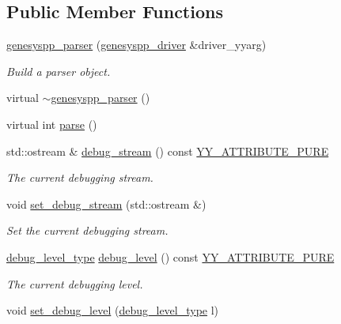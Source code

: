\subsection*{Public Member Functions}
\begin{DoxyCompactItemize}
\item 
\hyperlink{classyy_1_1genesyspp__parser_a49ace3543d937b9db0b6a95d82cc7697}{genesyspp\-\_\-parser} (\hyperlink{classgenesyspp__driver}{genesyspp\-\_\-driver} \&driver\-\_\-yyarg)
\begin{DoxyCompactList}\small\item\em Build a parser object. \end{DoxyCompactList}\item 
virtual \hyperlink{classyy_1_1genesyspp__parser_adcb7780163a3ebe0ff88183e55656c72}{$\sim$genesyspp\-\_\-parser} ()
\item 
virtual int \hyperlink{classyy_1_1genesyspp__parser_ab2fad51435ec4f28dfee2d5e4611f309}{parse} ()
\item 
std\-::ostream \& \hyperlink{classyy_1_1genesyspp__parser_aa075d51c915d279fc20716aa1a810abb}{debug\-\_\-stream} () const \hyperlink{_genesys_09_09-parser_8h_ad1405f082b8df6353a9d53c9709c4d03}{Y\-Y\-\_\-\-A\-T\-T\-R\-I\-B\-U\-T\-E\-\_\-\-P\-U\-R\-E}
\begin{DoxyCompactList}\small\item\em The current debugging stream. \end{DoxyCompactList}\item 
void \hyperlink{classyy_1_1genesyspp__parser_a3da3cd06905c1020664ece3104cb2383}{set\-\_\-debug\-\_\-stream} (std\-::ostream \&)
\begin{DoxyCompactList}\small\item\em Set the current debugging stream. \end{DoxyCompactList}\item 
\hyperlink{classyy_1_1genesyspp__parser_a0b40fe1ee9c8daa745e0acbcf25dca16}{debug\-\_\-level\-\_\-type} \hyperlink{classyy_1_1genesyspp__parser_a3081e7424bf97e38571bafc68704df8c}{debug\-\_\-level} () const \hyperlink{_genesys_09_09-parser_8h_ad1405f082b8df6353a9d53c9709c4d03}{Y\-Y\-\_\-\-A\-T\-T\-R\-I\-B\-U\-T\-E\-\_\-\-P\-U\-R\-E}
\begin{DoxyCompactList}\small\item\em The current debugging level. \end{DoxyCompactList}\item 
void \hyperlink{classyy_1_1genesyspp__parser_a48e47ca51b87c1c30043ee0b543b52a0}{set\-\_\-debug\-\_\-level} (\hyperlink{classyy_1_1genesyspp__parser_a0b40fe1ee9c8daa745e0acbcf25dca16}{debug\-\_\-level\-\_\-type} l)

\end{DoxyCompactItemize}
